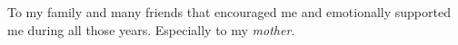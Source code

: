 To my family and many friends that encouraged me and emotionally supported me during all those years.
Especially to my \emph{mother}.

